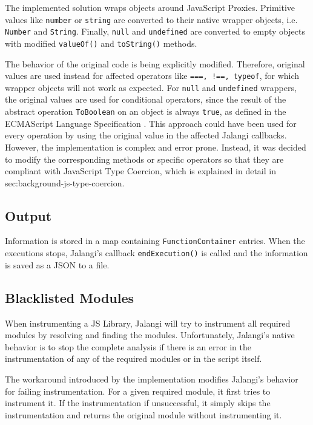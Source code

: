 The implemented solution wraps objects around JavaScript Proxies. Primitive values like \texttt{number} or \texttt{string} are converted to their native wrapper objects, i.e. \texttt{Number} and \texttt{String}. Finally, \texttt{null} and \texttt{undefined} are converted to empty objects with modified \texttt{valueOf()} and \texttt{toString()} methods.

The behavior of the original code is being explicitly modified. Therefore, original values are used instead for affected operators like \texttt{===, !==, typeof}, for which wrapper objects will not work as expected. For \texttt{null} and \texttt{undefined} wrappers, the original values are used for conditional operators, since the result of the abstract operation \texttt{ToBoolean} on an object is always \texttt{true}, as defined in the ECMAScript Language Specification \citep{ecma-script}. This approach could have been used for every operation by using the original value in the affected Jalangi callbacks. However, the implementation is complex and error prone. Instead, it was decided to modify the corresponding methods or specific operators so that they are compliant with JavaScript Type Coercion, which is explained in detail in {sec:background-js-type-coercion}.

\subsection{Output}
Information is stored in a map containing \texttt{FunctionContainer} entries. When the executions stops, Jalangi's callback \texttt{endExecution()} is called and the information is saved as a JSON to a file.


\subsection{Blacklisted Modules}
When instrumenting a JS Library, Jalangi will try to instrument all required modules by resolving and finding the modules. Unfortunately, Jalangi's native behavior is to stop the complete analysis if there is an error in the instrumentation of any of the required modules or in the script itself.

The workaround introduced by the implementation modifies Jalangi's behavior for failing instrumentation. For a given required module, it first tries to instrument it. If the instrumentation if unsuccessful, it simply skips the instrumentation and returns the original module without instrumenting it.

